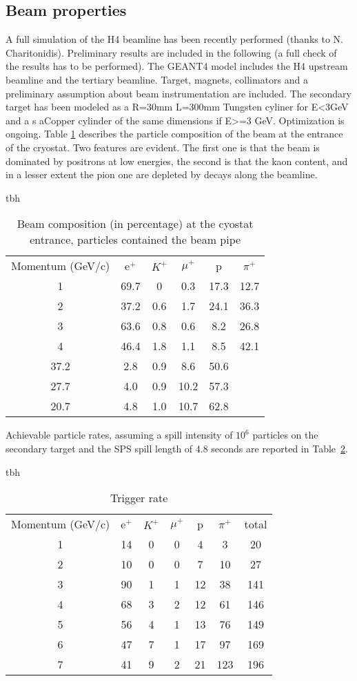 \subsection{Beam properties}
A full simulation of the H4 beamline has been recently performed (thanks to N. Charitonidis). Preliminary results are included in the following (a full check of the results has to be performed).
The GEANT4 model includes the H4 upstream beamline and the tertiary beamline.  Target, magnets, collimators and a preliminary assumption about beam instrumentation are included. The secondary target has been modeled as a R=30mm L=300mm Tungsten cyliner for   E<3GeV and a s aCopper cylinder of the same dimensions  if E>=3 GeV. Optimization is ongoing.
Table \ref{tab:beampartcomp} describes the particle composition of the beam  at the entrance of the cryostat. Two features are evident. The
first one is that the beam is dominated by positrons at low energies,
the second is that the kaon content, and in a lesser extent the pion
one are  depleted
by decays along the beamline. 
\begin{table}{tbh}
\label{tab:beampartcomp}
\caption{Beam composition (in percentage)  at the cyostat entrance, particles contained
  the beam pipe}
\begin{tabular}{|c|c|c|c|c|c|}
\hline
Momentum (GeV/c) & e$^+$ & $K^+$ & $\mu^+$ & p& $\pi^+$\\
1 & 69.7 & 0& 0.3 & 17.3 & 12.7\\
2 &37.2& 0.6& 1.7& 24.1&36.3\\
3 & 63.6&0.8&0.6&8.2&26.8\\
4 & 46.4 & 1.8 & 1.1 & 8.5 & 42.1 \\
37.2 & 2.8 & 0.9 & 8.6 & 50.6\\
27.7 & 4.0 & 0.9& 10.2 & 57.3\\
20.7 & 4.8 & 1.0 & 10.7 & 62.8 \\
\hline
\end{tabular}
\end{table}
Achievable particle rates, assuming a spill intensity of $10^6$
particles on the secondary target and the SPS spill length of 4.8
seconds are reported in Table~\ref{tab:beampartrates}. 
\begin{table}{tbh}
\label{tab:beampartrates}
\caption{Trigger rate  }
\begin{tabular}{|c|c|c|c|c|c|c|}
\hline
Momentum (GeV/c) & e$^+$ & $K^+$ & $\mu^+$ & p& $\pi^+$& total\\

1 & 14 & 0 & 0 & 4 & 3  & 20 \\
2 & 10 & 0 & 0 & 7 & 10 & 27 \\
3 & 90 & 1 & 1 & 12 & 38 & 141\\
4 & 68 & 3 & 2 & 12 & 61 & 146\\
5 & 56 & 4 & 1 & 13 & 76 & 149\\
6 & 47 & 7 & 1 & 17 & 97 & 169\\
7 & 41 & 9 & 2 & 21 & 123& 196\\
\hline
\end{tabular}
\end{table}
